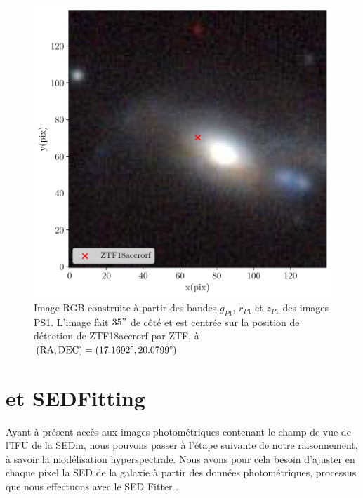 \documentclass[../main/main.tex]{subfiles}
\begin{document}
\begin{figure}[ht]
  \begin{minipage}[c]{0.45\textwidth}
    \includegraphics[width=\textwidth]{../figures/05_sedfit/ps_cutouts_ZTF18accrorf.pdf}
  \end{minipage}\hfill
  \begin{minipage}[c]{0.52\textwidth}
    \caption[Image RGB de PS1 centrée sur ZTF18accrorf.]{Image RGB
      construite à partir des bandes $g_{P1}$, $r_{P1}$ et
      $z_{P1}$ des images PS1. L'image fait $35"$ de côté et est centrée sur la position de
      détection de ZTF18accrorf par ZTF, à $(\text{RA}, \text{DEC})=(17.1692\degree,20.0799\degree)$}\label{fig:pscutoutsZTF18accrorf}
  \end{minipage}
\end{figure}


\section{ et SEDFitting}
\label{sec:cigale}

Ayant à présent accès aux images photométriques contenant le champ
de vue de l'IFU de la SEDm, nous pouvons passer à l'étape suivante de
notre raisonnement, à savoir la modélisation hyperspectrale. Nous
avons pour cela besoin d'ajuster en chaque pixel la SED de la
galaxie à partir des données photométriques, processus que nous
effectuons avec le SED Fitter .
\end{document}
